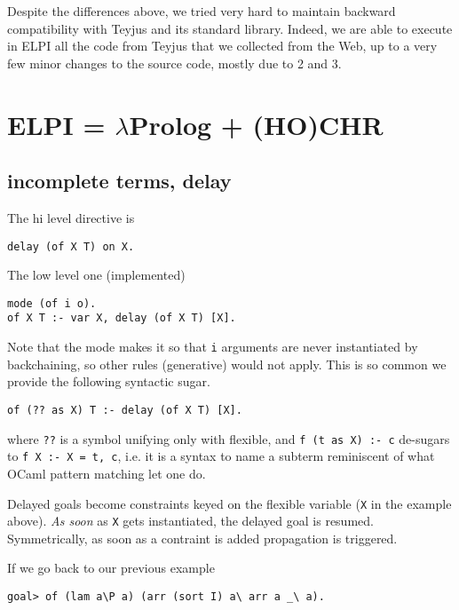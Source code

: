\documentclass{easychair}
\begin{document}
Despite the differences above, we tried very hard to maintain backward compatibility with Teyjus and its standard library. Indeed, we are able to execute in ELPI all the code from Teyjus that we collected from the Web, up to a very few minor changes to the source code, mostly due to 2 and 3.

\section{ELPI = $\lambda$Prolog + (HO)CHR}\label{sec:elpi}

\subsection{incomplete terms, delay}

The hi level directive is

\begin{verbatim}
delay (of X T) on X.
\end{verbatim}

The low level one (implemented)

\begin{verbatim}
mode (of i o).
of X T :- var X, delay (of X T) [X].
\end{verbatim}

Note that the mode makes it so that \verb+i+ arguments are never
instantiated by backchaining, so other rules (generative) would not
apply.  This is so common we provide the following syntactic sugar.

\begin{verbatim}
of (?? as X) T :- delay (of X T) [X].
\end{verbatim}

where \verb+??+ is a symbol unifying only with flexible, and
\verb+f (t as X) :- c+ de-sugars to \verb+f X :- X = t, c+,
i.e. it is a syntax to name a subterm reminiscent of what OCaml
pattern matching let one do.

Delayed goals become constraints keyed on the flexible variable
(\verb+X+ in the example above).  \emph{As soon} as \verb+X+ gets
instantiated, the delayed goal is resumed.  Symmetrically, as soon
as a contraint is added propagation is triggered.

If we go back to our previous example

\begin{verbatim}
goal> of (lam a\P a) (arr (sort I) a\ arr a _\ a).
\end{verbatim}
\end{document}
